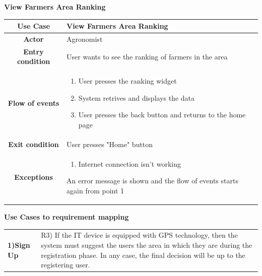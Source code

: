 \documentclass[table, 12pt]{article}
\begin{document}
\begin{itemize}
            \begin{table}[H]
                \item[] \textbf{View Farmers Area Ranking}
                \item[] 
                \centering
                \begin{tabular}{|c |m{}|}
                    \hline
                    \textbf{Use Case} & View Farmers Area Ranking\\ \hline
                    \textbf{Actor} & Agronomist\\ \hline
                    \textbf{Entry condition} & User wants to see the ranking of farmers in the area\\  \hline
                    \textbf{Flow of events} & \begin{enumerate}
                                                \item User presses the ranking widget 
                                                \item System retrives and displays the data
                                                \item User presses the back button and returns to the home page
                                            \end{enumerate}\\ \hline
                    \textbf{Exit condition} & User presses "Home" button\\ \hline
                    \textbf{Exceptions} & \begin{enumerate}
                        \item Internet connection isn't working
                    \end{enumerate}
                    An error message is shown and the flow of events starts again from point 1\\ \hline                    
                \end{tabular}
            \end{table}
            
        
        \newpage

        \item \textbf{Use Cases to requirement mapping}
        
        \item[] \begin{longtable}{|p{}|p{}|}
                    \hline
                    \cellcolor{SpringGreen!50}\textbf{1)Sign Up}\centering & R3) If the IT device is equipped with GPS technology, then the system must suggest the users the area in which they are during the registration phase. In any case, the final decision will be up to the registering user.
                                                                     

\end{longtable}
\end{itemize}
\end{document}
